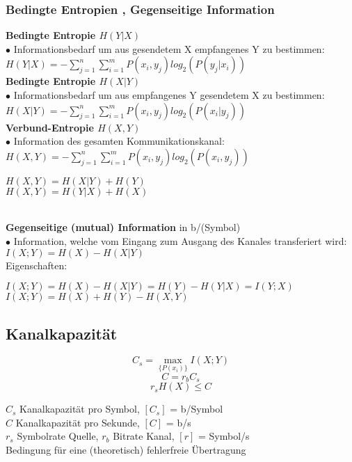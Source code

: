 \subsubsection{Bedingte Entropien , Gegenseitige Information }
	\textbf{Bedingte Entropie $H(Y|X)$}\\
	$\bullet$ Informationsbedarf um aus gesendetem X empfangenes Y zu bestimmen: $H(Y|X)	=- \sum\limits_{j=1}^{n} \sum\limits_{i=1}^{m} P(x_i,y_j) log_2(P(y_j|x_i))$ \\
	\textbf{Bedingte Entropie $H(X|Y)$}\\
	$\bullet$ Informationsbedarf um aus empfangenes Y gesendetem X zu bestimmen: $H(X|Y)	=- \sum\limits_{j=1}^{n} \sum\limits_{i=1}^{m} P(x_i,y_j) log_2(P(x_i|y_j))$ \\
	\textbf{Verbund-Entropie $H(X,Y)$} \\
	$\bullet$ Information des gesamten Kommunikationskanal:  $H(X,Y)	=- \sum\limits_{j=1}^{n} \sum\limits_{i=1}^{m} P(x_i,y_j) log_2(P(x_i,y_j))$ \qquad \parbox{6cm}{
		$H(X,Y) = H(X|Y) + H(Y)$ \\
		$H(X,Y) = H(Y|X) + H(X)$
	} \\
	\textbf{Gegenseitige (mutual) Information} in b/(Symbol)\\
	$\bullet$ Information, welche vom Eingang zum Ausgang des Kanales transferiert wird: $I(X;Y) = H(X)-H(X|Y)$\\
	\hspace*{0.5cm} Eigenschaften: \quad \parbox{12cm}{
	$I(X;Y) = H(X)-H(X|Y) = H(Y)-H(Y|X) = I(Y;X)$ \\
	$I(X;Y) = H(X)+H(Y)-H(X,Y)$}

\subsection{Kanalkapazität }
\begin{minipage}[c]{8cm}
	$$ C_s = \max\limits_{\{ P(x_i) \}}{I (X; Y)} $$
	$$ C = r_b C_s $$
	$$ r_s H(X) \leq C$$
\end{minipage}
\begin{minipage}[c]{10cm}
	$C_s$ Kanalkapazität pro Symbol, $[C_s]$ = b/Symbol \\
	$C$ Kanalkapazität pro Sekunde, $[C]$ = b/s \\
	$r_s$ Symbolrate Quelle, $r_b$ Bitrate Kanal, $[r]$ = Symbol/s \\
	Bedingung für eine (theoretisch) fehlerfreie Übertragung
\end{minipage}

